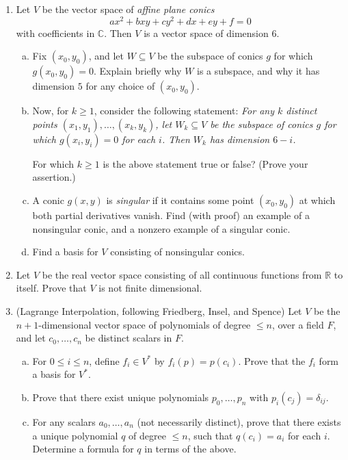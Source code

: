 \documentclass[12pt]{article}
\begin{document}
\begin{enumerate}
\item 
Let $V$ be the vector space of {\itshape affine plane conics}
\[
ax^2 + bxy + cy^2 + dx + ey + f = 0
\]
with coefficients in $\mathbb{C}$. Then $V$ is a vector space of dimension $6$. 

\begin{enumerate}[(a)]
\item Fix $(x_0, y_0)$, and let $W \subseteq V$ be the subspace of conics $g$ for which $g(x_0, y_0) = 0$. Explain briefly why $W$
is a subspace, and why it has dimension $5$ for any choice of $(x_0, y_0)$. 
\item Now, for $k \geq 1$, consider the following statement:
{\itshape For any $k$ distinct points $(x_1, y_1), \dots, (x_k, y_k)$, let $W_k \subseteq V$ be the subspace of conics $g$ for which $g(x_i, y_i) = 0$
for each $i$. Then $W_k$ has dimension $6 - i$.}

For which $k \geq 1$ is the above statement true or false? (Prove your assertion.)

\item A conic $g(x, y)$ is {\itshape singular} if it contains some point $(x_0, y_0)$ at which both partial derivatives vanish. Find (with proof) an example
of a nonsingular conic, and a nonzero example of a singular conic.

\item Find a basis for $V$ consisting of nonsingular conics. 
\end{enumerate}

\item
Let $V$ be the real vector space consisting of all continuous functions from $\mathbb{R}$ to itself. Prove that $V$ is not finite dimensional.

\item (Lagrange Interpolation, following Friedberg, Insel, and Spence)
Let $V$ be the $n + 1$-dimensional vector space of polynomials of degree $\leq n$, over a field $F$, and let $c_0, \dots, c_n$ be
distinct scalars in $F$.
\begin{enumerate}[(a)]

\item 
For $0 \leq i \leq n$, define $f_i \in V^*$ by $f_i(p) = p(c_i)$. Prove that the $f_i$ form a basis for $V^*$.
\item 
Prove that there exist unique polynomials $p_0, \dots, p_n$ with $p_i(c_j) = \delta_{ij}$.
\item 
For any scalars $a_0, \dots, a_n$ (not necessarily distinct), prove that there exists a unique polynomial $q$ of degree $\leq n$,
such that $q(c_i) = a_i$ for each $i$. Determine a formula for $q$ in terms of the above.


\end{enumerate}
\end{enumerate}
\end{document}
